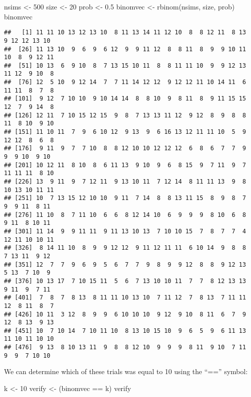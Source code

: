 \documentclass[
]{book}
\newenvironment{Shaded}{\begin{snugshade}}{\end{snugshade}}
\newcommand{\DecValTok}[1]{\textcolor[rgb]{0.00,0.00,0.81}{#1}}
\newcommand{\FloatTok}[1]{\textcolor[rgb]{0.00,0.00,0.81}{#1}}
\newcommand{\FunctionTok}[1]{\textcolor[rgb]{0.00,0.00,0.00}{#1}}
\newcommand{\NormalTok}[1]{#1}
\newcommand{\OtherTok}[1]{\textcolor[rgb]{0.56,0.35,0.01}{#1}}
\newcommand{\SpecialCharTok}[1]{\textcolor[rgb]{0.00,0.00,0.00}{#1}}
\begin{document}
\begin{Shaded}
\begin{Highlighting}[]
\NormalTok{nsims }\OtherTok{\textless{}{-}} \DecValTok{500}
\NormalTok{size }\OtherTok{\textless{}{-}} \DecValTok{20}
\NormalTok{prob }\OtherTok{\textless{}{-}} \FloatTok{0.5}
\NormalTok{binomvec }\OtherTok{\textless{}{-}} \FunctionTok{rbinom}\NormalTok{(nsims, size, prob)}
\NormalTok{binomvec}
\end{Highlighting}
\end{Shaded}

\begin{verbatim}
##   [1] 11 11 10 13 12 13 10  8 11 13 14 11 12 10  8  8 12 11  8 13  9 12 12 13 10
##  [26] 11 13 10  9  6  9  6 12  9  9 11 12  8  8 11  8  9  9 10 11 10  8  9 12 11
##  [51] 10 13  6  9 10  8  7 13 15 10 11  8  8 11 11 10  9  9 12 13 11 12  9 10  8
##  [76] 12  5 10  9 12 14  7  7 11 14 12 12  9 12 12 11 10 14 11  6 11 11  8  7  8
## [101]  9 12  7 10 10  9 10 14 14  8  8 10  9  8 11  8  9 11 15 15 12  7  9 14  8
## [126] 12 11  7 10 15 12 15  9  8  7 13 13 11 12  9 12  8  9  8  8 11  8 10  9 10
## [151] 11 10 11  7  9  6 10 12  9 13  9  6 16 13 12 11 11 10  5  9 12 12  8  6  8
## [176]  9 11  9  7  7 10  8  8 12 10 10 12 12 12  6  8  6  7  7  9  9  9 10  9 10
## [201] 10 12 11  8 10  8  6 11 13  9 10  9  6  8 15  9  7 11  9  7 11 11 11  8 10
## [226] 13  9 11  9  7 12 11  9 13 10 11  7 12 14  8 11 11 13  9  8 10 13 10 11 11
## [251] 10  7 13 15 12 10 10  9 11  7 14  8  8 13 11 15  8  9  8  7  9  9 11  8 11
## [276] 11 10  8  7 11 10  6  6  8 12 14 10  6  9  9  9  8 10  6  8  9 11  8 10 11
## [301] 11 14  9  9 11 11  9 11 13 10 13  7 10 10 15  7  8  7  7  4 12 11 10 10 11
## [326]  8 14 11 10  8  9  9 12 12  9 11 12 11 11  6 10 14  9  8  8  7 13 11  9 12
## [351] 12  7  7  9  6  9  5  6  7  7  9  8  9  9 12  8  8  9 12 13  5 13  7 10  9
## [376] 10 13 17  7 10 15 11  5  6  7 13 10 10 11  7  7  8 12 13 13  9 11  9  7 11
## [401]  7  8  7  8 13  8 11 11 10 13 10  7 11 12  7  8 13  7 11 11 12  8 11  8  7
## [426] 10 11  3 12  8  9  9  6 10 10 10  9 12  9 10  8 11  6  7  9 12  8 13  9 13
## [451] 10  7 10 14  7 10 11 10  8 13 10 15 10  9  6  5  9  6 11 13 11 10 11 10 10
## [476]  9 13  8 10 13 11  9  8  8 12 10  9  9  9  8 11  9 10  7 11  9  9  7 10 10
\end{verbatim}

We can determine which of these trials was equal to 10 using the ``=='' symbol:

\begin{Shaded}
\begin{Highlighting}[]
\NormalTok{k }\OtherTok{\textless{}{-}} \DecValTok{10}
\NormalTok{verify }\OtherTok{\textless{}{-}}\NormalTok{ (binomvec }\SpecialCharTok{==}\NormalTok{ k)}
\NormalTok{verify}
\end{Highlighting}
\end{Shaded}
\end{document}
